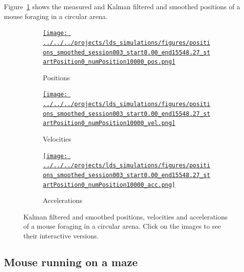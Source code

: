 \documentclass[12pt]{article}
\begin{document}
Figure~\ref{fig:foraging} shows the measured and Kalman filtered and smoothed
positions of a mouse foraging in a circular arena.

\begin{figure}
    \begin{center}

        \begin{subfigure}{\textwidth}
            \centering
            \href{http://www.gatsby.ucl.ac.uk/~rapela/fwg/lds_repo/inference/figures/positions_smoothed_session003_start0.00_end15548.27_startPosition0_numPosition10000_pos.html}{\texttt{[image: ../../../projects/lds\_simulations/figures/positions\_smoothed\_session003\_start0.00\_end15548.27\_startPosition0\_numPosition10000\_pos.png]}}
            \caption{Positions}
        \end{subfigure}

        \begin{subfigure}{\textwidth}
            \centering
            \href{http://www.gatsby.ucl.ac.uk/~rapela/fwg/lds_repo/inference/figures/positions_smoothed_session003_start0.00_end15548.27_startPosition0_numPosition10000_vel.html}{\texttt{[image: ../../../projects/lds\_simulations/figures/positions\_smoothed\_session003\_start0.00\_end15548.27\_startPosition0\_numPosition10000\_vel.png]}}
            \caption{Velocities}
        \end{subfigure}

        \begin{subfigure}{\textwidth}
            \centering
            \href{http://www.gatsby.ucl.ac.uk/~rapela/fwg/lds_repo/inference/figures/positions_smoothed_session003_start0.00_end15548.27_startPosition0_numPosition10000_acc.html}{\texttt{[image: ../../../projects/lds\_simulations/figures/positions\_smoothed\_session003\_start0.00\_end15548.27\_startPosition0\_numPosition10000\_acc.png]}}
            \caption{Accelerations}
        \end{subfigure}


        \caption{Kalman filtered and smoothed positions, velocities and
        accelerations of a mouse foraging in a circular arena. Click on the
        images to see their interactive versions.}

        \label{fig:foraging}

    \end{center}
\end{figure}

\subsection{Mouse running on a maze}
\end{document}
